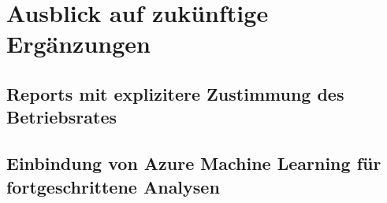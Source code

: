 \section{Ausblick auf zukünftige Ergänzungen} \label{sec:praktischeUmsetzung:ausblick}

\subsection{Reports mit explizitere Zustimmung des Betriebsrates}

\subsection{Einbindung von Azure Machine Learning für fortgeschrittene Analysen} \label{sec:praktischeUmsetzung:ausblick:aml}